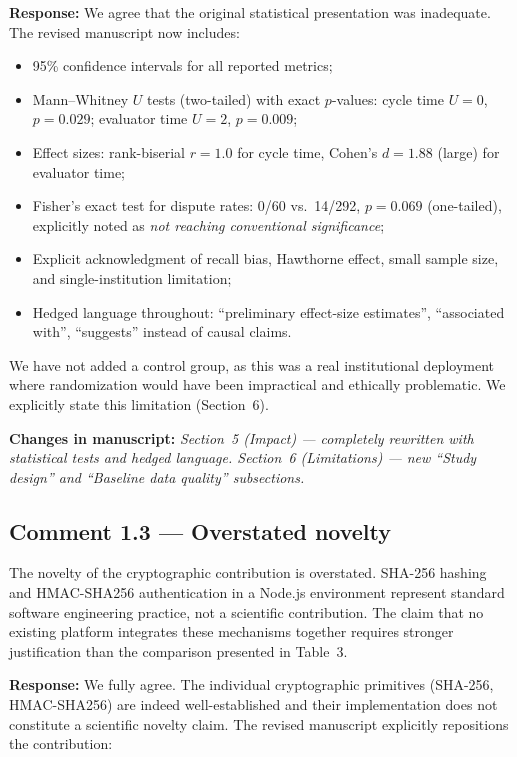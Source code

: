 \documentclass[11pt,a4paper]{article}
\newcommand{\response}[1]{\par\noindent\textcolor{responsecolor}{\textbf{Response:}} #1}
\newcommand{\change}[1]{\par\noindent\textcolor{changecolor}{\textbf{Changes in manuscript:}} \textit{#1}}
\begin{document}
\response{We agree that the original statistical presentation was inadequate. The revised manuscript now includes:}

\begin{itemize}[nosep]
  \item 95\% confidence intervals for all reported metrics;
  \item Mann--Whitney $U$ tests (two-tailed) with exact $p$-values: cycle time $U=0$, $p=0.029$; evaluator time $U=2$, $p=0.009$;
  \item Effect sizes: rank-biserial $r=1.0$ for cycle time, Cohen's $d=1.88$ (large) for evaluator time;
  \item Fisher's exact test for dispute rates: 0/60 vs.\ 14/292, $p=0.069$ (one-tailed), explicitly noted as \emph{not reaching conventional significance};
  \item Explicit acknowledgment of recall bias, Hawthorne effect, small sample size, and single-institution limitation;
  \item Hedged language throughout: ``preliminary effect-size estimates'', ``associated with'', ``suggests'' instead of causal claims.
\end{itemize}

We have not added a control group, as this was a real institutional deployment where randomization would have been impractical and ethically problematic. We explicitly state this limitation (Section~6).

\change{Section~5 (Impact) --- completely rewritten with statistical tests and hedged language. Section~6 (Limitations) --- new ``Study design'' and ``Baseline data quality'' subsections.}

\bigskip

\subsection*{Comment 1.3 --- Overstated novelty}

\begin{reviewerbox}
The novelty of the cryptographic contribution is overstated. SHA-256 hashing and HMAC-SHA256 authentication in a Node.js environment represent standard software engineering practice, not a scientific contribution. The claim that no existing platform integrates these mechanisms together requires stronger justification than the comparison presented in Table~3.
\end{reviewerbox}

\response{We fully agree. The individual cryptographic primitives (SHA-256, HMAC-SHA256) are indeed well-established and their implementation does not constitute a scientific novelty claim. The revised manuscript explicitly repositions the contribution:}
\end{document}
